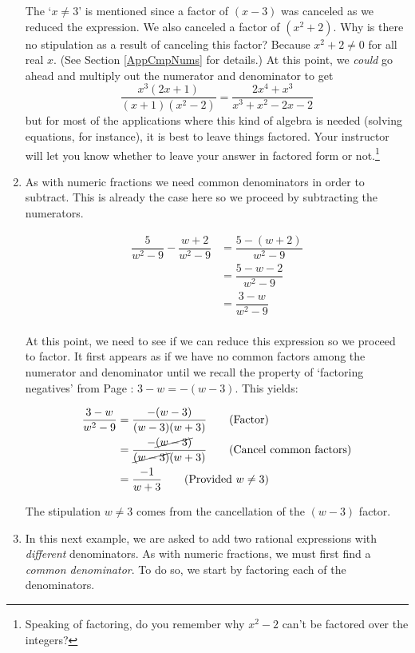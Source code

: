 \begin{ex}
\begin{enumerate}
The `$x \neq 3$' is mentioned since a factor of $(x-3)$ was canceled as we reduced the expression.  We also canceled a factor of $(x^2+2)$.  Why is there no stipulation as a result of canceling this factor? Because $x^2 + 2 \neq 0$ for all real $x$. (See Section \ref{AppCmpNums} for details.)  At this point, we \textit{could} go ahead and multiply out the numerator and denominator to get \[\dfrac{x^3(2x+1)}{(x+1)(x^2-2)}  = \dfrac{2x^4 + x^3}{x^3+x^2-2x-2}\] but for most of the applications where this kind of algebra is needed (solving equations, for instance), it is best to leave things factored.  Your instructor will let you know whether to leave your answer in factored form or not.\footnote{Speaking of factoring, do you remember why $x^2-2$ can't be factored over the integers?}

\item  As with numeric fractions we need common denominators in order to subtract.  This is already the case here so we proceed by subtracting the numerators.

\begin{align*}
\dfrac{5}{w^2 - 9} - \dfrac{w+2}{w^2-9} & = \dfrac{5 - (w+2)}{w^2 - 9}\tag{Subtract fractions}\\ 
& = \dfrac{5 - w - 2}{w^2-9} \tag{Distribute} \\ 
& = \dfrac{3-w}{w^2-9} \tag{Combine like terms} \\
\end{align*}

At this point, we need to see if we can reduce this expression so we proceed to factor.  It first appears as if we have no common factors among the numerator and denominator until we recall the property of `factoring negatives' from Page \pageref{propertiesofnegatives}:  $3-w = -(w-3)$. This yields:

\begin{align*}
\dfrac{3-w}{w^2-9} & = \dfrac{-(w-3)}{(w-3)(w+3)} \tag{Factor} \\ 
& = \dfrac{-\cancel{(w-3)}}{\cancel{(w-3)}(w+3)} \tag{Cancel common factors} \\ 
& = \dfrac{-1}{w+3} \tag{Provided $w \neq 3$} \\ 
\end{align*}

The stipulation $w \neq 3$ comes from the cancellation of the $(w-3)$ factor.

\item  	In this next example, we are asked to add two rational expressions with \textit{different} denominators.  As with numeric fractions, we must first find a \textit{common denominator}. To do so, we start by factoring each of the denominators.


\end{enumerate}
\end{ex}
